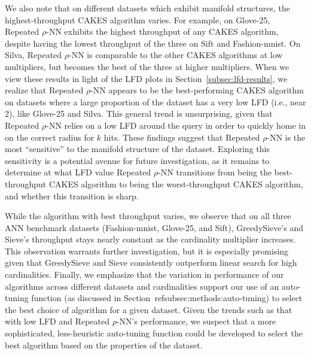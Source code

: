 We also note that on different datasets which exhibit manifold structures, the highest-throughput CAKES algorithm varies. 
For example, on Glove-25, Repeated $\rho$-NN exhibits the highest throughput of any CAKES algorithm, despite having the lowest throughput of the three on Sift and Fashion-mnist. 
On Silva,  Repeated $\rho$-NN is comparable to the other CAKES algorithms at low multipliers, but becomes the best of the three at higher multipliers. 
When we view these results in light of the LFD plots in Section~\ref{subsec:lfd-results}, we realize that  Repeated $\rho$-NN appears to be the best-performing CAKES algorithm on datasets where a large proportion of the dataset has a very low LFD (i.e., near 2), like Glove-25 and Silva. 
This general trend is unsurprising, given that Repeated $\rho$-NN relies on a low LFD around the query in order to quickly home in on the correct radius for $k$ hits. 
These findings suggest that Repeated $\rho$-NN is the most ``sensitive'' to the manifold structure of the dataset. 
Exploring this sensitivity is a potential avenue for future investigation, as it remains to determine at what LFD value Repeated $\rho$-NN transitions from being the best-throughput CAKES algorithm to being the worst-throughput CAKES algorithm, and whether this transition is sharp. 


While the algorithm with best throughput varies, we observe that on all three ANN benchmark datasets (Fashion-mnist, Glove-25, and Sift), GreedySieve's and Sieve's throughput stays nearly constant as the cardinality multiplier increases. 
This observation warrants further investigation, but it is especially promising given that GreedySieve and Sieve consistently outperform linear search for high cardinalities. 
Finally, we emphasize that the variation in performance of our algorithms across different datasets and cardinalities support our use of an auto-tuning function (as discussed in Section~ref{subsec:methods:auto-tuning}) to select the best choice of algorithm for a given dataset. 
Given the trends such as that with low LFD and Repeated $\rho$-NN's performance, we suspect that a more sophisticated, less-heuristic auto-tuning function could be developed to select the best algorithm based on the properties of the dataset.


